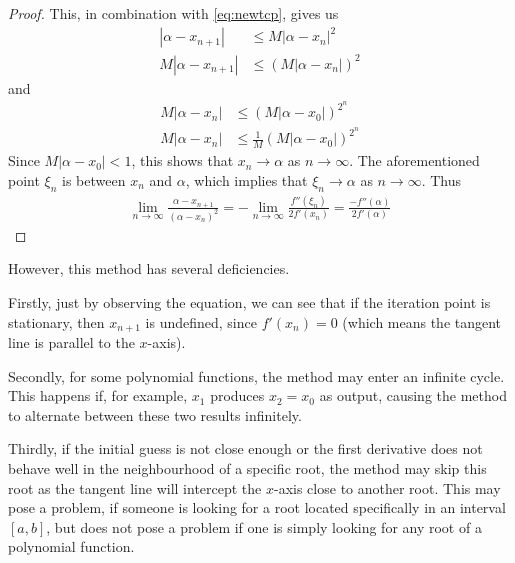 \documentclass[
  digital, %
  table,   %
  nolof,     %
  nolot,     %
	draft, %
]{fithesis3}
\begin{document}
\begin{proof}
This, in combination with \eqref{eq:newtcp}, gives us
\begin{align}
  \left|\alpha - x_{n+1}\right| &\leq M\left|\alpha - x_{n}\right|^2 \\
	M\left|\alpha - x_{n+1}\right| &\leq (M\left|\alpha - x_{n}\right|)^2 
\end{align}
and
\begin{align}
  M\left|\alpha - x_{n}\right| &\leq (M\left|\alpha - x_{0}\right|)^{2^n} \\
	M\left|\alpha - x_{n}\right| &\leq \frac{1}{M}(M\left|\alpha - x_{0}\right|)^{2^n}
\end{align}
Since $M\left|\alpha-x_{0}\right| < 1$, this shows that $x_{n}\rightarrow\alpha$ as $n\rightarrow\infty$.
The aforementioned point $\xi_{n}$ is between $x_{n}$ and $\alpha$, which implies that $\xi_{n}\rightarrow\alpha$ as $n\rightarrow\infty$. Thus \parencite[p.~61]{rootApproxMeth}
\begin{align}
 \lim_{n\to\infty} \frac{\alpha - x_{n+1}}{(\alpha - x_{n})^2} = -\lim_{n\to\infty} \frac{f''(\xi_{n})}{2f'(x_{n})} = \frac{-f''(\alpha)}{2f'(\alpha)}
\end{align}
\end{proof}
However, this method has several deficiencies.

Firstly, just by observing the equation, we can see that if the iteration point is stationary, then $x_{n+1}$ is undefined, since $f'(x_{n}) = 0$ (which means the tangent line is parallel to the $x$-axis). 

Secondly, for some polynomial functions, the method may enter an infinite cycle. This happens if, for example, $x_{1}$ produces $x_{2} = x_{0}$ as output, causing the method to alternate between these two results infinitely.

Thirdly, if the initial guess is not close enough or the first derivative does not behave well in the neighbourhood of a specific root, the method may skip this root as the tangent line will intercept the $x$-axis close to another root. This may pose a problem, if someone is looking for a root located specifically in an interval $[a,b]$, but does not pose a problem if one is simply looking for any root of a polynomial function.
\end{document}
